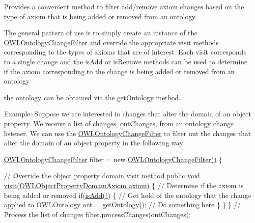 Provides a convenient method to filter add/remove axiom changes based on the type of axiom that is being added or removed from an ontology. 

The general pattern of use is to simply create an instance of the {\ttfamily \hyperlink{classorg_1_1semanticweb_1_1owlapi_1_1util_1_1_o_w_l_ontology_change_filter}{O\-W\-L\-Ontology\-Change\-Filter}} and override the appropriate visit methods corresponding to the types of axioms that are of interest. Each visit corresponds to a single change and the {\ttfamily is\-Add} or {\ttfamily is\-Remove} methods can be used to determine if the axiom corresponding to the change is being added or removed from an ontology
\begin{DoxyItemize}
\item the ontology can be obtained via the {\ttfamily get\-Ontology} method. 
\end{DoxyItemize}

Example\-: Suppose we are interested in changes that alter the domain of an object property. We receive a list of changes, {\ttfamily ont\-Changes}, from an ontology change listener. We can use the {\ttfamily \hyperlink{classorg_1_1semanticweb_1_1owlapi_1_1util_1_1_o_w_l_ontology_change_filter}{O\-W\-L\-Ontology\-Change\-Filter}} to filter out the changes that alter the domain of an object property in the following way\-: 


\begin{DoxyPre}
\hyperlink{classorg_1_1semanticweb_1_1owlapi_1_1util_1_1_o_w_l_ontology_change_filter}{OWLOntologyChangeFilter} filter = new \hyperlink{classorg_1_1semanticweb_1_1owlapi_1_1util_1_1_o_w_l_ontology_change_filter_a2b332c3473117a2a4118508777f5e02b}{OWLOntologyChangeFilter()} \{
\end{DoxyPre}



\begin{DoxyPre}
     // Override the object property domain visit method
     public void \hyperlink{interfaceorg_1_1semanticweb_1_1owlapi_1_1model_1_1_o_w_l_axiom_visitor_a5282829e5e310d8fc80c84f0942bbe1a}{visit(OWLObjectPropertyDomainAxiom axiom)} \{
         // Determine if the axiom is being added or removed
         if(\hyperlink{classorg_1_1semanticweb_1_1owlapi_1_1util_1_1_o_w_l_ontology_change_filter_a06084e7b7901f522616957d267eff3e9}{isAdd()}) \{
             // Get hold of the ontology that the change applied to
             OWLOntology ont = \hyperlink{classorg_1_1semanticweb_1_1owlapi_1_1util_1_1_o_w_l_ontology_change_filter_ad84435b276df3ba4a6ea9cfd1a6a6430}{getOntology()};
             // Do something here
         \}
     \}
\}
// Process the list of changes
filter.processChanges(ontChanges);
\end{DoxyPre}
 

